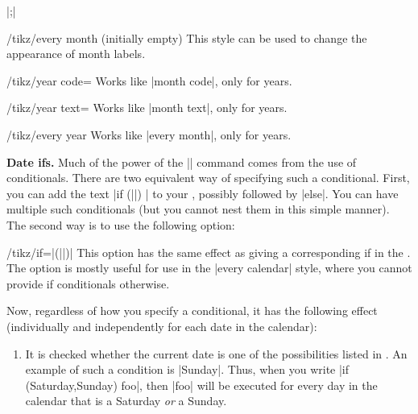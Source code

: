 \begin{command}{\calendar {}|;|}
    \begin{stylekey}{/tikz/every month (initially \normalfont empty)}
        This style can be used to change the appearance of month labels.
    \end{stylekey}

    \begin{key}{/tikz/year code=}
        Works like |month code|, only for years.
    \end{key}

    \begin{key}{/tikz/year text=}
        Works like |month text|, only for years.
    \end{key}


    \begin{key}{/tikz/every year}
        Works like |every month|, only for years.
    \end{key}


    \medskip
    \textbf{Date ifs.}
    Much of the power of the |\calendar| command comes from the use of
    conditionals. There are two equivalent way of specifying such a
    conditional. First, you can add the text
    |if (||) | to your , possibly followed by |else|. You
    can have multiple such conditionals (but you cannot nest them in this
    simple manner). The second way is to use the following option:
    \begin{key}{/tikz/if=|(||)|}
        This option has the same effect as giving a corresponding if in the
        . The option is mostly useful for use in
        the |every calendar| style, where you cannot provide if conditionals
        otherwise.
    \end{key}
    Now, regardless of how you specify a conditional, it has the following
    effect (individually and independently for each date in the calendar):
    \begin{enumerate}
        \item It is checked whether the current date is one of the
            possibilities listed in . An example of such a
            condition is |Sunday|. Thus, when you write
            |if (Saturday,Sunday) {foo}|, then |foo| will be executed for every
            day in the calendar that is a Saturday \emph{or} a Sunday.


\end{enumerate}
\end{command}
